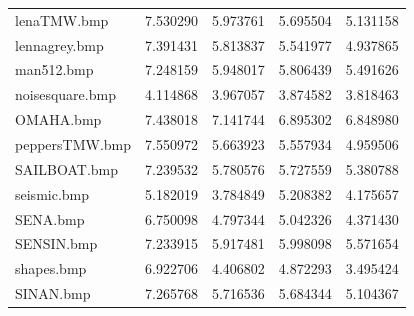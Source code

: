 \documentclass{article}
\begin{document}
\begin{table}[H]
\begin{tabular}{lrrrr}
    lenaTMW.bmp        & 7.530290                     & 5.973761                               & 5.695504                                  & 5.131158                                   \\
    lennagrey.bmp      & 7.391431                     & 5.813837                               & 5.541977                                  & 4.937865                                   \\
    man512.bmp         & 7.248159                     & 5.948017                               & 5.806439                                  & 5.491626                                   \\
    noisesquare.bmp    & 4.114868                     & 3.967057                               & 3.874582                                  & 3.818463                                   \\
    OMAHA.bmp          & 7.438018                     & 7.141744                               & 6.895302                                  & 6.848980                                   \\
    peppersTMW.bmp     & 7.550972                     & 5.663923                               & 5.557934                                  & 4.959506                                   \\
    SAILBOAT.bmp       & 7.239532                     & 5.780576                               & 5.727559                                  & 5.380788                                   \\
    seismic.bmp        & 5.182019                     & 3.784849                               & 5.208382                                  & 4.175657                                   \\
    SENA.bmp           & 6.750098                     & 4.797344                               & 5.042326                                  & 4.371430                                   \\
    SENSIN.bmp         & 7.233915                     & 5.917481                               & 5.998098                                  & 5.571654                                   \\
    shapes.bmp         & 6.922706                     & 4.406802                               & 4.872293                                  & 3.495424                                   \\
    SINAN.bmp          & 7.265768                     & 5.716536                               & 5.684344                                  & 5.104367                                   \\

\end{tabular}
\end{table}
\end{document}
